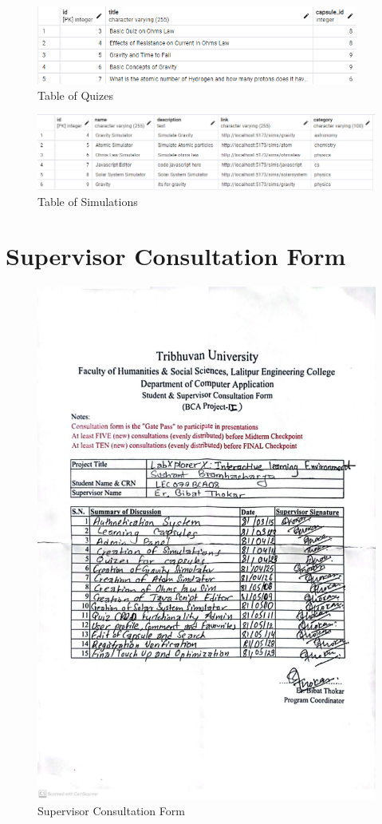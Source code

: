 \begin{figure}[H]
    \centering
        \includegraphics[width=400px]{Diagrams/db/quiz.png}
    \caption{Table of Quizes}
\end{figure}
\begin{figure}[H]
    \centering
        \includegraphics[width=430px]{Diagrams/db/sims.png}
    \caption{Table of Simulations}
\end{figure}
\section{Supervisor Consultation Form}
\begin{figure}[H]
    \centering
        \includegraphics[width=430px]{Diagrams/supervisor.jpg}
    \caption{Supervisor Consultation Form}
\end{figure}